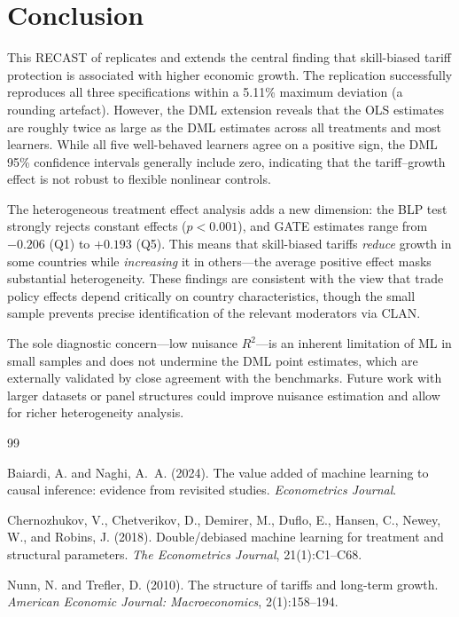 \documentclass[12pt]{article}
\begin{document}
\section{Conclusion}

This RECAST of \citet{nunntrefler2010} replicates and extends the central
finding that skill-biased tariff protection is associated with higher
economic growth. The replication successfully reproduces all three
specifications within a 5.11\% maximum deviation (a rounding artefact).
However, the DML extension reveals that the OLS estimates are roughly
twice as large as the DML estimates across all treatments and most
learners. While all five well-behaved learners agree on a positive sign,
the DML 95\% confidence intervals generally include zero, indicating that
the tariff--growth effect is not robust to flexible nonlinear controls.

The heterogeneous treatment effect analysis adds a new dimension: the BLP
test strongly rejects constant effects ($p < 0.001$), and GATE estimates
range from $-0.206$ (Q1) to $+0.193$ (Q5). This means that skill-biased
tariffs \textit{reduce} growth in some countries while \textit{increasing}
it in others---the average positive effect masks substantial heterogeneity.
These findings are consistent with the view that trade policy effects
depend critically on country characteristics, though the small sample
prevents precise identification of the relevant moderators via CLAN.

The sole diagnostic concern---low nuisance $R^2$---is an inherent
limitation of ML in small samples and does not undermine the DML point
estimates, which are externally validated by close agreement with the
\citet{baiardi2024} benchmarks. Future work with larger datasets or
panel structures could improve nuisance estimation and allow for richer
heterogeneity analysis.


\begin{thebibliography}{99}

Baiardi, A. and Naghi, A.~A. (2024).
\newblock The value added of machine learning to causal inference: evidence from
  revisited studies.
\newblock \textit{Econometrics Journal}.

Chernozhukov, V., Chetverikov, D., Demirer, M., Duflo, E., Hansen, C.,
  Newey, W., and Robins, J. (2018).
\newblock Double/debiased machine learning for treatment and structural
  parameters.
\newblock \textit{The Econometrics Journal}, 21(1):C1--C68.

Nunn, N. and Trefler, D. (2010).
\newblock The structure of tariffs and long-term growth.
\newblock \textit{American Economic Journal: Macroeconomics}, 2(1):158--194.

\end{thebibliography}
\end{document}
